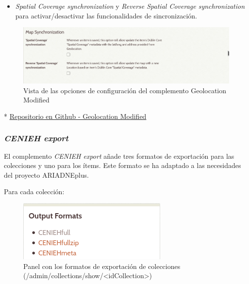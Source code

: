 \documentclass[
]{article}
\providecommand{\tightlist}{%
  \setlength{\itemsep}{0pt}\setlength{\parskip}{0pt}}
\begin{document}
\begin{itemize}
\tightlist
\item
  \emph{Spatial Coverage synchronization} y \emph{Reverse Spatial
  Coverage synchronization} para activar/desactivar las funcionalidades
  de sincronización.
\end{itemize}

\begin{figure}
\hypertarget{geolocation-3}{%
\centering
\includegraphics{../_static/images/geolocation-3.png}
\caption{Vista de las opciones de configuración del complemento
Geolocation Modified}\label{geolocation-3}
}
\end{figure}

*
\href{https://github.com/gcm1001/TFG-CeniehAriadne/tree/master/omeka/plugins/Geolocation}{Repositorio
en Github - Geolocation Modified}

\hypertarget{cenieh-export}{%
\subsubsection{\texorpdfstring{\emph{CENIEH
export}}{CENIEH export}}\label{cenieh-export}}

El complemento \emph{CENIEH export} añade tres formatos de exportación
para las colecciones y uno para los ítems. Este formato se ha adaptado a
las necesidades del proyecto ARIADNEplus.

Para cada colección:

\begin{figure}
\hypertarget{cenieh-export-1}{%
\centering
\includegraphics{../_static/images/cenieh-export-1.png}
\caption{Panel con los formatos de exportación de colecciones
(/admin/collections/show/\textless idCollection\textgreater)}\label{cenieh-export-1}
}
\end{figure}
\end{document}
